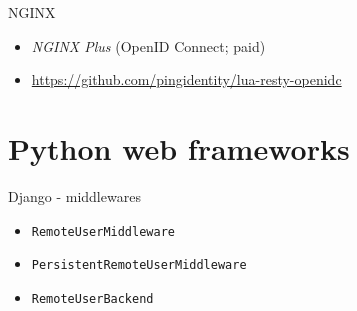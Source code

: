 \documentclass[ignorenonframetext,aspectratio=169]{beamer}
\providecommand{\tightlist}{%
  \setlength{\itemsep}{0pt}\setlength{\parskip}{0pt}}
\begin{document}
\begin{frame}[plain]
\centering
{}
\end{frame}

\begin{frame}[fragile]{NGINX}
\begin{itemize}
\tightlist
\item {\em NGINX Plus} (OpenID Connect; paid)
\item \url{https://github.com/pingidentity/lua-resty-openidc}
\end{itemize}
\end{frame}

\section{Python web frameworks}

\begin{frame}{Django - middlewares}
\begin{itemize}
\tightlist

\item {\tt RemoteUserMiddleware}
\item {\tt PersistentRemoteUserMiddleware}
\item {\tt RemoteUserBackend}

\end{itemize}
\end{frame}
\end{document}
